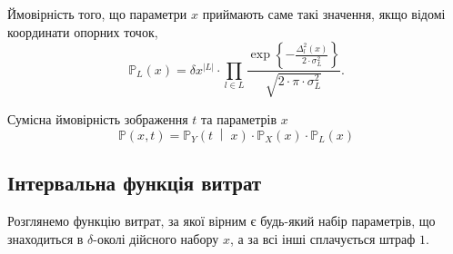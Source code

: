Ймовірність того, що параметри $x$ приймають саме такі значення,
якщо відомі координати опорних точок,
\begin{equation*}
  \mathbb{P}_L\left( x \right)
  = \delta x^{\left| L \right|} \cdot \prod_{l \in L}
      \frac{\exp{\left\{- \frac{\Delta_l^2\left( x \right)}
           {2 \cdot \sigma^2_L} \right\}}}
           {\sqrt{2 \cdot \pi \cdot \sigma^2_L}}.
\end{equation*}

Сумісна ймовірність зображення $t$ та параметрів $x$
\begin{equation*}
  \mathbb{P}\left( x, t \right)
  = \mathbb{P}_Y\left( t \;\middle|\; x \right)
    \cdot \mathbb{P}_X\left( x \right)
    \cdot \mathbb{P}_L\left( x \right)
\end{equation*}

\subsection{Інтервальна функція витрат}

Розглянемо функцію витрат,
за якої вірним є будь-який набір параметрів,
що знаходиться в $\delta$-околі дійсного набору $x$,
а за всі інші сплачується штраф $1$.


